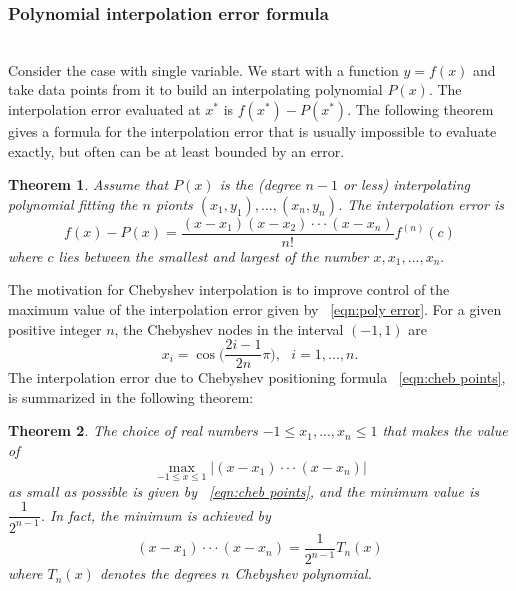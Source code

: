 \documentclass[12pt]{amsart}
\newtheorem{theorem}{Theorem}%
\theoremstyle{definition}
\begin{document}
\subsubsection{Polynomial interpolation error formula}~\\
Consider the case with single variable. We start with a function $y=f(x)$ and take data points from it to build an interpolating polynomial $P(x)$. The interpolation error evaluated at $x^*$ is $f(x^*)-P(x^*)$. The following theorem gives a formula for the interpolation error that is usually impossible to evaluate exactly, but often can be at least bounded by an error.
\begin{theorem}
Assume that $P(x)$ is the (degree $n-1$ or less) interpolating polynomial fitting the $n$ pionts $(x_1,y_1),...,(x_n,y_n)$. The interpolation error is 
\begin{equation}
\label{eqn:poly error}
f(x)-P(x)=\frac{(x-x_1)(x-x_2)\cdot\cdot\cdot(x-x_n)}{n!}f^{(n)}(c)
\end{equation}
where $c$ lies between the smallest and largest of the number $x,x_1,...,x_n.$
\end{theorem}
The motivation for Chebyshev interpolation is to improve control of the maximum value of the interpolation error given by ~\eqref{eqn:poly error}. For a given positive integer $n$, the Chebyshev nodes in the interval $(-1,1)$ are
\begin{equation}
\label{eqn:cheb points}
x_i=\cos\Big(\frac{2i-1}{2n}\pi\Big),\mbox{ }i=1,...,n.
\end{equation}
The interpolation error due to Chebyshev positioning formula ~\eqref{eqn:cheb points}, is summarized in the following theorem:
\begin{theorem}
The choice of real numbers $-1\le x_1,...,x_n\le 1$ that makes the value of 
\begin{equation}
\max_{-1 \leq x \leq 1}|(x-x_1)\cdot\cdot\cdot(x-x_n)|
\end{equation}
as small as possible is given by ~\eqref{eqn:cheb points}, and the minimum value is $\dfrac{1}{2^{n-1}}$. In fact, the minimum is achieved by 
\begin{equation}
\label{eqn:cheb error}
(x-x_1)\cdot\cdot\cdot(x-x_n)=\frac{1}{2^{n-1}}T_n(x)
\end{equation}
where $T_n(x)$ denotes the degrees $n$ Chebyshev polynomial.
\end{theorem}
\end{document}
